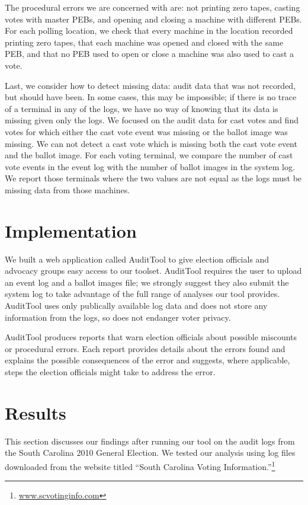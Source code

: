 \documentclass[letterpaper,twocolumn,10pt]{article}
\begin{document}
The procedural errors we are concerned with are: not printing zero tapes,
casting votes with master PEBs, and opening and closing a machine with
different PEBs. For each polling location, we check that every machine in the
location recorded printing zero tapes, that each machine was opened and closed
with the same PEB, and that no PEB used to open or close a machine was also used
to cast a vote.  

Last, we consider how to detect missing data: audit data that was not recorded,
but should have been. In some cases, this may be impossible; if there is no
trace of a terminal in any of the logs, we have no way of knowing that its data
is missing given only the logs. We focused on the audit data for cast votes and
find votes for which either the cast vote event was missing or the ballot image
was missing. We can not detect a cast vote which is missing both the cast vote
event and the ballot image. For each voting terminal, we compare the number of
cast vote events in the event log with the number of ballot images in the system
log. We report those terminals where the two values are not equal as the logs
must be missing data from those machines.  

\section{Implementation}
We built a web application called AuditTool to give election officials and
advocacy groups easy access to our toolset. AuditTool requires the user to
upload an event log and a ballot images file; we strongly suggest they also
submit the system log to take advantage of the full range of analyses our tool
provides. AuditTool uses only publically available log data and does not store
any information from the logs, so does not endanger voter privacy.  

AuditTool produces reports that warn election officials about possible miscounts
or procedural errors. Each report provides details about the errors found and
explains the possible consequences of the error and suggests, where applicable,
steps the election officials might take to address the error.

\section{Results}
This section discusses our findings after running our tool on the audit logs
from the South Carolina 2010 General Election. We tested our analysis using log
files downloaded from the website titled “South Carolina Voting
Information.”\footnote{\url{www.scvotinginfo.com}} 
\end{document}
